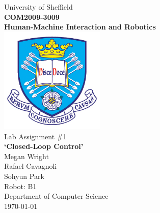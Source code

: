 \documentclass[hidelinks,a4paper,11pt]{article}
\begin{document}
	
	\begin{titlepage}
		
		\begin{center}
			{\LARGE University of Sheffield}\\[1cm]
			\huge {\bfseries COM2009-3009\\Human-Machine Interaction and Robotics}\\[1cm]
			\includegraphics[width=5cm]{tuoslogo.png}\\[1cm]
			{\LARGE Lab Assignment \#1\\\textbf{`Closed-Loop Control'}}\\[2cm]
			
			
			{\Large Megan Wright}\\
			{\Large Rafael Cavagnoli}\\
			{\Large Sohyun Park}\\[1cm]
			
			{\LARGE Robot: B1}\\[1cm]
			
			{\LARGE Department of Computer Science}\\
			{\Large \today}
		\end{center}
		
	\end{titlepage}
	
\end{document}
